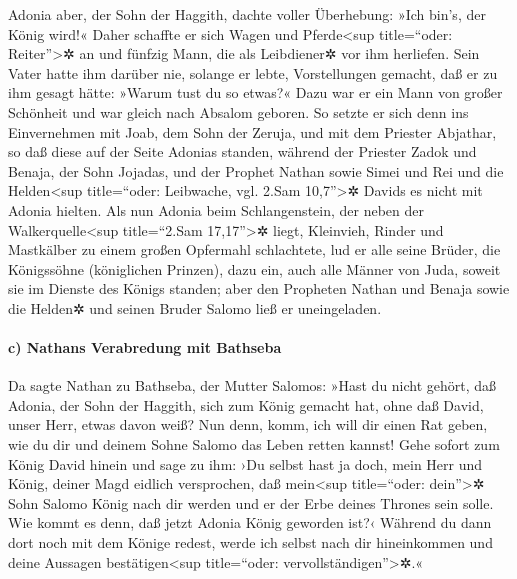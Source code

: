 Adonia aber, der Sohn der Haggith, dachte voller
Überhebung: »Ich bin's, der König wird!« Daher schaffte er sich Wagen
und Pferde\textless sup title=``oder: Reiter''\textgreater✲ an und
fünfzig Mann, die als Leibdiener✲ vor ihm herliefen. Sein
Vater hatte ihm darüber nie, solange er lebte, Vorstellungen gemacht,
daß er zu ihm gesagt hätte: »Warum tust du so etwas?« Dazu war er ein
Mann von großer Schönheit und war gleich nach Absalom geboren.
So setzte er sich denn ins Einvernehmen mit Joab, dem Sohn
der Zeruja, und mit dem Priester Abjathar, so daß diese auf der Seite
Adonias standen, während der Priester Zadok und Benaja,
der Sohn Jojadas, und der Prophet Nathan sowie Simei und Rei und die
Helden\textless sup title=``oder: Leibwache, vgl. 2.Sam
10,7''\textgreater✲ Davids es nicht mit Adonia hielten.
Als nun Adonia beim Schlangenstein, der neben der
Walkerquelle\textless sup title=``2.Sam 17,17''\textgreater✲ liegt,
Kleinvieh, Rinder und Mastkälber zu einem großen Opfermahl schlachtete,
lud er alle seine Brüder, die Königssöhne (königlichen Prinzen), dazu
ein, auch alle Männer von Juda, soweit sie im Dienste des Königs
standen; aber den Propheten Nathan und Benaja sowie die
Helden✲ und seinen Bruder Salomo ließ er uneingeladen.

\hypertarget{c-nathans-verabredung-mit-bathseba}{%
\paragraph{c) Nathans Verabredung mit
Bathseba}\label{c-nathans-verabredung-mit-bathseba}}

Da sagte Nathan zu Bathseba, der Mutter Salomos: »Hast du
nicht gehört, daß Adonia, der Sohn der Haggith, sich zum König gemacht
hat, ohne daß David, unser Herr, etwas davon weiß? Nun
denn, komm, ich will dir einen Rat geben, wie du dir und deinem Sohne
Salomo das Leben retten kannst! Gehe sofort zum König
David hinein und sage zu ihm: ›Du selbst hast ja doch, mein Herr und
König, deiner Magd eidlich versprochen, daß mein\textless sup
title=``oder: dein''\textgreater✲ Sohn Salomo König nach dir werden und
er der Erbe deines Thrones sein solle. Wie kommt es denn, daß jetzt
Adonia König geworden ist?‹ Während du dann dort noch mit
dem Könige redest, werde ich selbst nach dir hineinkommen und deine
Aussagen bestätigen\textless sup title=``oder:
vervollständigen''\textgreater✲.«

